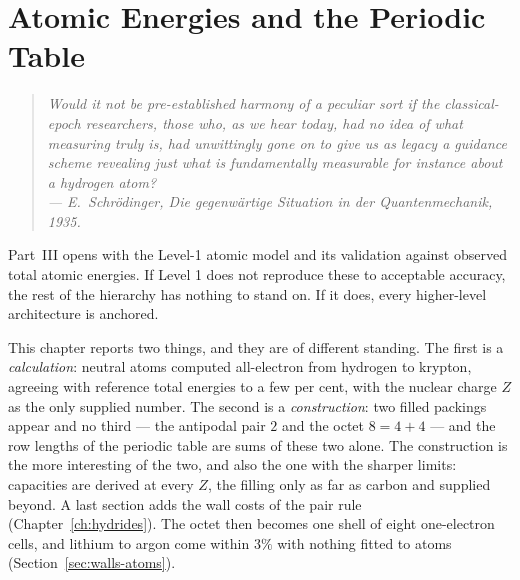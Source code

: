 \chapter{Atomic Energies and the Periodic Table}\label{ch:atoms}
%
%


\begin{quote}
\itshape Would it not be pre-established harmony of a peculiar sort if the classical-epoch researchers, those who, as we hear today, had no idea of what measuring truly is, had unwittingly gone on to give us as legacy a guidance scheme revealing just what is fundamentally measurable for instance about a hydrogen atom?\\
\normalfont\hfill --- E.~Schr\"odinger, \emph{Die gegenw\"artige Situation in der Quantenmechanik}, 1935.
\end{quote}
\bigskip

Part~III opens with the Level-1 atomic model and its validation against observed total atomic
energies. If Level 1 does not reproduce these to acceptable accuracy, the rest of the hierarchy
has nothing to stand on. If it does, every higher-level architecture is anchored.

This chapter reports two things, and they are of different standing. The first is a
\emph{calculation}: neutral atoms computed all-electron from hydrogen to krypton, agreeing with
reference total energies to a few per cent, with the nuclear charge $Z$ as the only supplied
number. The second is a \emph{construction}: two filled packings appear and no third --- the
antipodal pair $2$ and the octet $8=4{+}4$ --- and the row lengths of the periodic table are sums
of these two alone. The construction is the more interesting of the two, and also the one with the
sharper limits: capacities are derived at every $Z$, the filling only as far as carbon and
supplied beyond. A last section adds the wall costs of the pair rule (Chapter~\ref{ch:hydrides}). The octet
then becomes one shell of eight one-electron cells, and lithium to argon come within $3\%$ with nothing
fitted to atoms (Section~\ref{sec:walls-atoms}).

